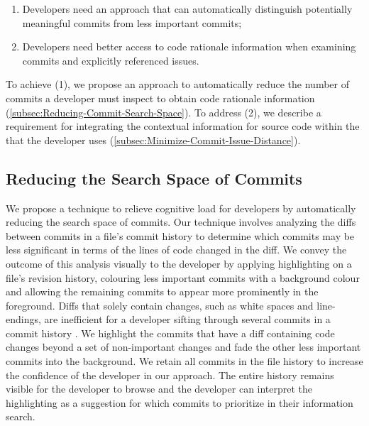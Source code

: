 \begin{enumerate}[label={(\arabic*)}]
    \item Developers need an approach that can automatically distinguish potentially meaningful commits from less important commits;
    \item Developers need better access to code rationale information when examining commits and explicitly referenced issues.
\end{enumerate}

To achieve (1), we propose an approach to automatically reduce the number of commits a developer must inspect to obtain code rationale information (\autoref{subsec:Reducing-Commit-Search-Space}).
To address (2), we describe a requirement for integrating the contextual information for source code within the  that the developer uses (\autoref{subsec:Minimize-Commit-Issue-Distance}).

\subsection{Reducing the Search Space of Commits}
\label{subsec:Reducing-Commit-Search-Space}

We propose a technique to relieve cognitive load for developers by automatically reducing the search space of commits.
Our technique involves analyzing the diffs between commits in a file's commit history to determine which commits may be less significant in terms of the lines of code changed in the diff.
We convey the outcome of this analysis visually to the developer by applying highlighting on a file's revision history, 
colouring less important commits with a background colour and allowing the remaining commits to appear more prominently in the foreground.
Diffs that solely contain changes, such as white spaces and line-endings, are inefficient for a developer sifting through several commits in a commit history \cite{codoban_software_2015}.
We highlight the commits that have a diff containing code changes beyond a set of non-important changes and fade the other less important commits into the background.
We retain all commits in the file history to increase the confidence of the developer in our approach.
The entire history remains visible for the developer to browse 
and the developer can interpret the highlighting as a suggestion for which commits to prioritize in their information search.


